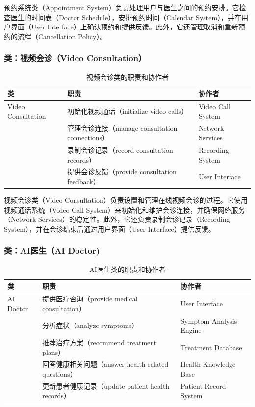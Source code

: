 预约系统类（Appointment System）负责处理用户与医生之间的预约安排。它检查医生的时间表（Doctor Schedule），安排预约时间（Calendar System），并在用户界面（User Interface）上确认预约和提供反馈。此外，它还管理取消和重新预约的流程（Cancellation Policy）。

\subsubsection{类：视频会诊（Video Consultation）}
\begin{table}[htbp]
	\centering
	\begin{tabular}{|l|l|l|}
		\hline
		\textbf{类} & \textbf{职责} & \textbf{协作者} \\
		\hline
		Video Consultation & 初始化视频通话（initialize video calls） & Video Call System \\
		& 管理会诊连接（manage consultation connections） & Network Services \\
		& 录制会诊记录（record consultation records） & Recording System \\
		& 提供会诊反馈（provide consultation feedback） & User Interface \\
		\hline
	\end{tabular}
	\caption{视频会诊类的职责和协作者}
	\label{tab:video_consultation}
\end{table}

视频会诊类（Video Consultation）负责设置和管理在线视频会诊的过程。它使用视频通话系统（Video Call System）来初始化和维护会诊连接，并确保网络服务（Network Services）的稳定性。此外，它还负责录制会诊记录（Recording System），并在会诊结束后通过用户界面（User Interface）提供反馈。

\subsubsection{类：AI医生（AI Doctor)}
\begin{table}[htbp]
	\centering
	\begin{tabular}{|l|l|l|}
		\hline
		\textbf{类} & \textbf{职责} & \textbf{协作者} \\
		\hline
		AI Doctor & 提供医疗咨询（provide medical consultation） & User Interface \\
		& 分析症状（analyze symptoms） & Symptom Analysis Engine \\
		& 推荐治疗方案（recommend treatment plans） & Treatment Database \\
		& 回答健康相关问题（answer health-related questions） & Health Knowledge Base \\
		& 更新患者健康记录（update patient health records） & Patient Record System \\
		\hline
	\end{tabular}
	\caption{AI医生类的职责和协作者}
	\label{tab:ai_doctor}
\end{table}

